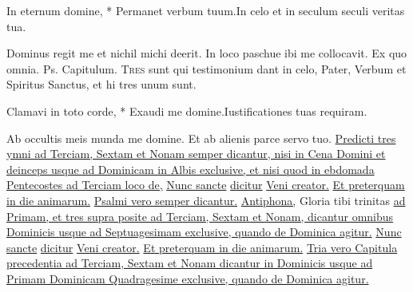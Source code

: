 \begin{multicols*}{2}
\begin{responsory-breve}
{In eternum domine, * Permanet verbum tuum.}{In celo et in seculum seculi veritas tua.}
\end{responsory-breve}
\newline \V Dominus regit me et nichil michi deerit.
\newline \R In loco paschue ibi me collocavit.
 Ex quo omnia. {\color{Red} Ps.}    {\color{Red} Capitulum.}
\lettrine[lines=2]{\zallmancaps \color{Red} T}{res} sunt qui testimonium dant in celo, Pater, Verbum et Spiritus Sanctus, et hi tres unum sunt.
\begin{responsory-breve}
{Clamavi in toto corde, * Exaudi me domine.}{Iustificationes tuas requiram.}
\end{responsory-breve}
\newline \V Ab occultis meis munda me domine.
\newline \R Et ab alienis parce servo tuo.
\newline \ul{Predicti tres ymni ad Terciam, Sextam et Nonam semper dicantur, nisi in Cena Domini et deinceps usque ad Dominicam in Albis exclusive, et nisi quod in ebdomada Pentecostes ad Terciam loco de,} \hyperlink{nunc-sancte}{Nunc sancte} \ul{dicitur} \hyperlink{veni-creator-spiritus}{Veni creator.} \ul{Et preterquam in die animarum.}
\newline \ul{Psalmi vero semper dicantur.}
\newline \ul{Antiphona,} Gloria tibi trinitas \ul{ad Primam, et tres supra posite ad Terciam, Sextam et Nonam, dicantur omnibus Dominicis usque ad Septuagesimam exclusive, quando de Dominica agitur.} \hyperlink{nunc-sancte}{Nunc sancte} \ul{dicitur} \hyperlink{veni-creator-spiritus}{Veni creator.} \ul{Et preterquam in die animarum.}
\newline \ul{Tria vero Capitula precedentia ad Terciam, Sextam et Nonam dicantur in Dominicis usque ad Primam Dominicam Quadragesime exclusive, quando de Dominica agitur.}

\end{multicols*}

